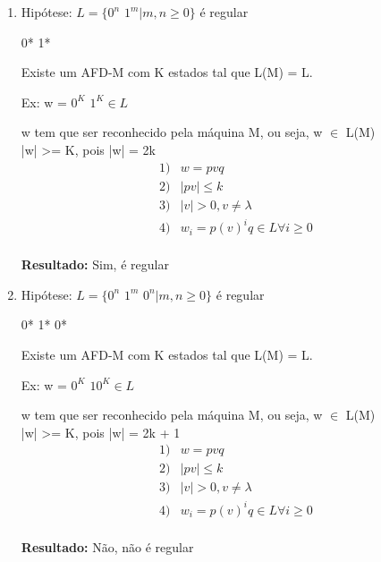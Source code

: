 \begin{question}
  
   \begin{enumerate}[label=\textbf{\alph*})]
   
   		\item 
   		
   		Hipótese: $L = \{0^{n}$ $1^{m} | m,n \geq 0 \}$ é regular
   		
   		0* 1*
   		
   		Existe um AFD-M com K estados tal que L(M) = L.
   		
   		Ex: w = $0^{K}$ $1^{K} \in L$
   		
   		w tem que ser reconhecido pela máquina M, ou seja, w $\in$ L(M) \\
   		
   		|w| >= K, pois |w| = 2k \\
   		
   		\begin{align*}
   		   1) & w = pvq \\
   		   2) & | pv | \leq k \\
   		   3) & | v | > 0, v \neq \lambda \\
   		   4) & w_i = p(v)^{i} q  \in L \forall i \geq 0 \\
   		\end{align*}   		   		
   		
   		\textbf{Resultado:} Sim, é regular
   		
   		\item 
   	
   		Hipótese: $L = \{0^{n}$ $1^{m}$ $0^{n} | m,n \geq 0 \}$ é regular
   		
   		0* 1* 0*
   		
   		Existe um AFD-M com K estados tal que L(M) = L.
   		
   		Ex: w = $0^{K}$ $ 10^{K} \in L$
   		
   		w tem que ser reconhecido pela máquina M, ou seja, w $\in$ L(M) \\
   		
   		|w| >= K, pois |w| = 2k + 1 \\
   		
   		\begin{align*}
   		   1) & w = pvq \\
   		   2) & | pv | \leq k \\
   		   3) & | v | > 0, v \neq \lambda \\
   		   4) & w_i = p(v)^{i} q  \in L \forall i \geq 0 \\
   		\end{align*}   		  
   		
   		\textbf{Resultado:} Não, não é regular
   		
   \end{enumerate}
\end{question}

\newpage